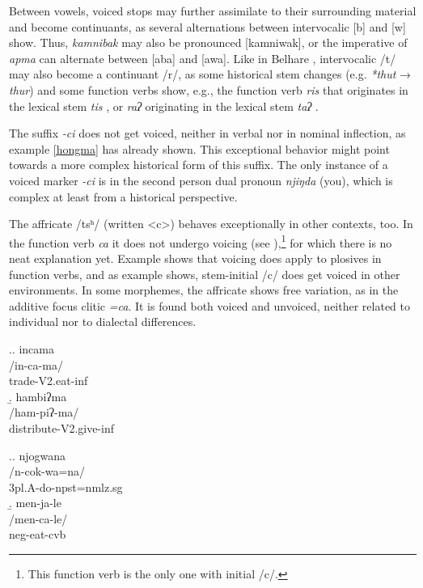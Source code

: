 Between vowels, voiced stops may further assimilate to their surrounding material and become continuants, as several alternations between intervocalic [b] and [w] show. Thus, \emph{kamnibak}  may also be pronounced [kamniwak], or the imperative of \emph{apma}  can alternate between [aba] and [awa]. Like in Belhare \citep{Bickel1998Rhythm}, intervocalic /t/ may also become a continuant /r/, as some historical stem changes (e.g. \emph{*thut} → \emph{thur}) and some function verbs show, e.g., the function verb \emph{ris} that originates in the lexical stem \emph{tis} , or \emph{raʔ} originating in the lexical stem \emph{taʔ} . 


The suffix \emph{-ci} does not get voiced, neither in verbal nor in nominal inflection, as example \ref{hongma} has already shown. This exceptional behavior might point towards a more complex historical form of this suffix. The only instance of a voiced marker \emph{-ci} is in the second person dual pronoun \emph{njiŋda} (you), which is complex at least from a historical perspective. 

The affricate /tsʰ/ (written <c>) behaves exceptionally in other contexts, too. In the function verb \emph{ca}  it does not undergo voicing (see \Next[a]),\footnote{This function verb is the only one with initial /c/.} for which there is no neat explanation yet. Example \Next[b] shows that voicing does apply to plosives in function verbs, and as example \NNext shows, stem-initial /c/ does get voiced in other environments. In some morphemes, the affricate shows free variation, as in the additive focus clitic \emph{=ca}. It is found both voiced and unvoiced, neither related to individual nor to dialectal differences. 
 
 \ex.\a. \glll incama\\
 /in-ca-ma/\\
 trade{\sc -V2.eat-inf}\\
 \b. \glll  hambiʔma\\
 /ham-piʔ-ma/\\
 distribute{\sc -V2.give-inf}\\
 
 
 \ex.\a. \glll njogwana\\
 /n-cok-wa=na/\\
 {\sc 3pl.A-}do{\sc -npst=nmlz.sg}\\
 \b. \glll men-ja-le\\
 /men-ca-le/\\
 {\sc neg-}eat{\sc -cvb}\\
 

